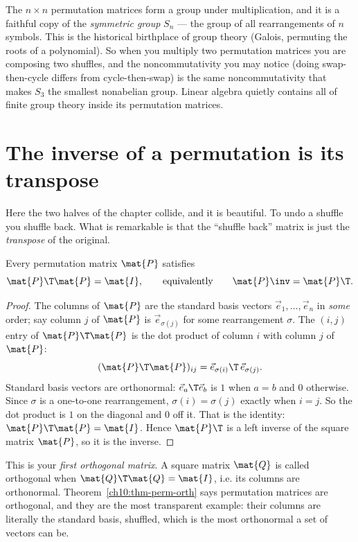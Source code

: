 \begin{connectionbox}
The $n\times n$ permutation matrices form a group under multiplication, and it is a faithful copy of
the \emph{symmetric group} $S_n$ --- the group of all rearrangements of $n$ symbols. This is the
historical birthplace of group theory (Galois, permuting the roots of a polynomial). So when you
multiply two permutation matrices you are composing two shuffles, and the noncommutativity you may
notice (doing swap-then-cycle differs from cycle-then-swap) is the same noncommutativity that makes
$S_3$ the smallest nonabelian group. Linear algebra quietly contains all of finite group theory
inside its permutation matrices.
\end{connectionbox}

\section{The inverse of a permutation is its transpose}

Here the two halves of the chapter collide, and it is beautiful. To undo a shuffle you shuffle back.
What is remarkable is that the ``shuffle back'' matrix is just the \emph{transpose} of the original.

\begin{theorem}\label{ch10:thm-perm-orth}
Every permutation matrix $\mat{P}$ satisfies
\[
  \mat{P}\T\mat{P} = \mat{I},
  \qquad\text{equivalently}\qquad
  \mat{P}\inv = \mat{P}\T.
\]
\end{theorem}

\begin{proof}
The columns of $\mat{P}$ are the standard basis vectors $\vec{e}_1,\dots,\vec{e}_n$ in \emph{some}
order; say column $j$ of $\mat{P}$ is $\vec{e}_{\sigma(j)}$ for some rearrangement $\sigma$. The
$(i,j)$ entry of $\mat{P}\T\mat{P}$ is the dot product of column $i$ with column $j$ of $\mat{P}$:
\[
  (\mat{P}\T\mat{P})_{ij} = \vec{e}_{\sigma(i)}\T\,\vec{e}_{\sigma(j)}.
\]
Standard basis vectors are orthonormal: $\vec{e}_a\T\vec{e}_b$ is $1$ when $a=b$ and $0$ otherwise.
Since $\sigma$ is a one-to-one rearrangement, $\sigma(i)=\sigma(j)$ exactly when $i=j$. So the dot
product is $1$ on the diagonal and $0$ off it. That is the identity: $\mat{P}\T\mat{P}=\mat{I}$.
Hence $\mat{P}\T$ is a left inverse of the square matrix $\mat{P}$, so it is the inverse.
\end{proof}

This is your \emph{first orthogonal matrix}. A square matrix $\mat{Q}$ is called orthogonal when
$\mat{Q}\T\mat{Q}=\mat{I}$, i.e. its columns are orthonormal. Theorem~\ref{ch10:thm-perm-orth} says
permutation matrices are orthogonal, and they are the most transparent example: their columns are
literally the standard basis, shuffled, which is the most orthonormal a set of vectors can be.

